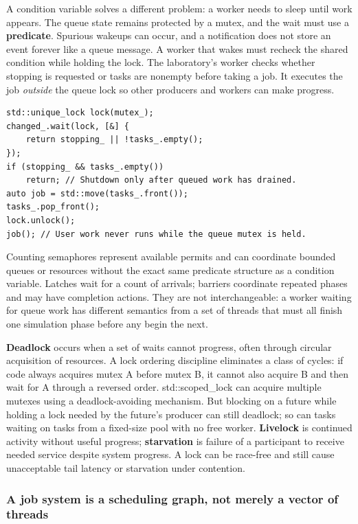 A condition variable solves a different problem: a worker needs to sleep until work appears. The queue state remains protected by a mutex, and the wait must use a \textbf{predicate}. Spurious wakeups can occur, and a notification does not store an event forever like a queue message. A worker that wakes must recheck the shared condition while holding the lock. The laboratory's worker checks whether stopping is requested or tasks are nonempty before taking a job. It executes the job \emph{outside} the queue lock so other producers and workers can make progress.

\begin{verbatim}
std::unique_lock lock(mutex_);
changed_.wait(lock, [&] {
    return stopping_ || !tasks_.empty();
});
if (stopping_ && tasks_.empty())
    return; // Shutdown only after queued work has drained.
auto job = std::move(tasks_.front());
tasks_.pop_front();
lock.unlock();
job(); // User work never runs while the queue mutex is held.
\end{verbatim}

Counting semaphores represent available permits and can coordinate bounded queues or resources without the exact same predicate structure as a condition variable. Latches wait for a count of arrivals; barriers coordinate repeated phases and may have completion actions. They are not interchangeable: a worker waiting for queue work has different semantics from a set of threads that must all finish one simulation phase before any begin the next.

\textbf{Deadlock} occurs when a set of waits cannot progress, often through circular acquisition of resources. A lock ordering discipline eliminates a class of cycles: if code always acquires mutex A before mutex B, it cannot also acquire B and then wait for A through a reversed order. std::scoped\_lock can acquire multiple mutexes using a deadlock-avoiding mechanism. But blocking on a future while holding a lock needed by the future's producer can still deadlock; so can tasks waiting on tasks from a fixed-size pool with no free worker. \textbf{Livelock} is continued activity without useful progress; \textbf{starvation} is failure of a participant to receive needed service despite system progress. A lock can be race-free and still cause unacceptable tail latency or starvation under contention.

\subsubsection{A job system is a scheduling graph, not merely a vector of threads}\label{a-job-system-is-a-scheduling-graph-not-merely-a-vector-of-threads}

